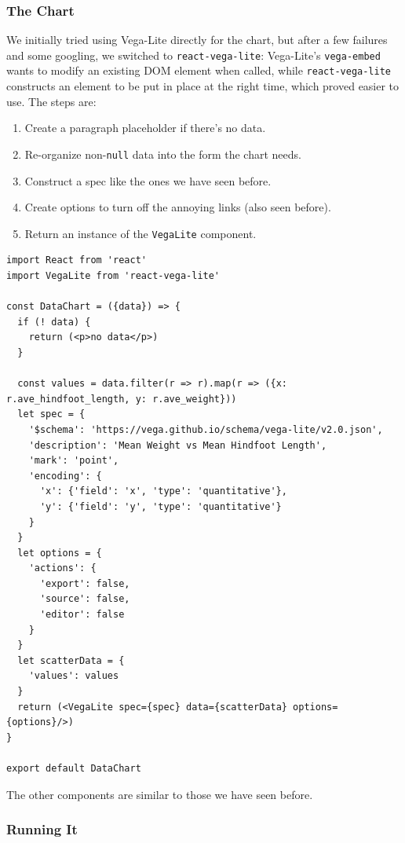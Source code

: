 \subsubsection{The Chart}\label{s:capstone-chart}

We initially tried using Vega-Lite directly for the chart, but after a
few failures and some googling, we switched to \texttt{react-vega-lite}:
Vega-Lite's \texttt{vega-embed} wants to modify an existing DOM element
when called, while \texttt{react-vega-lite} constructs an element to be
put in place at the right time, which proved easier to use. The steps
are:

\begin{enumerate}
\tightlist
\item
  Create a paragraph placeholder if there's no data.
\item
  Re-organize non-\texttt{null} data into the form the chart needs.
\item
  Construct a spec like the ones we have seen before.
\item
  Create options to turn off the annoying links (also seen before).
\item
  Return an instance of the \texttt{VegaLite} component.
\end{enumerate}

\begin{verbatim}
import React from 'react'
import VegaLite from 'react-vega-lite'

const DataChart = ({data}) => {
  if (! data) {
    return (<p>no data</p>)
  }

  const values = data.filter(r => r).map(r => ({x: r.ave_hindfoot_length, y: r.ave_weight}))
  let spec = {
    '$schema': 'https://vega.github.io/schema/vega-lite/v2.0.json',
    'description': 'Mean Weight vs Mean Hindfoot Length',
    'mark': 'point',
    'encoding': {
      'x': {'field': 'x', 'type': 'quantitative'},
      'y': {'field': 'y', 'type': 'quantitative'}
    }
  }
  let options = {
    'actions': {
      'export': false,
      'source': false,
      'editor': false
    }
  }
  let scatterData = {
    'values': values
  }
  return (<VegaLite spec={spec} data={scatterData} options={options}/>)
}

export default DataChart
\end{verbatim}

The other components are similar to those we have seen before.

\subsubsection{Running It}\label{s:capstone-run}

